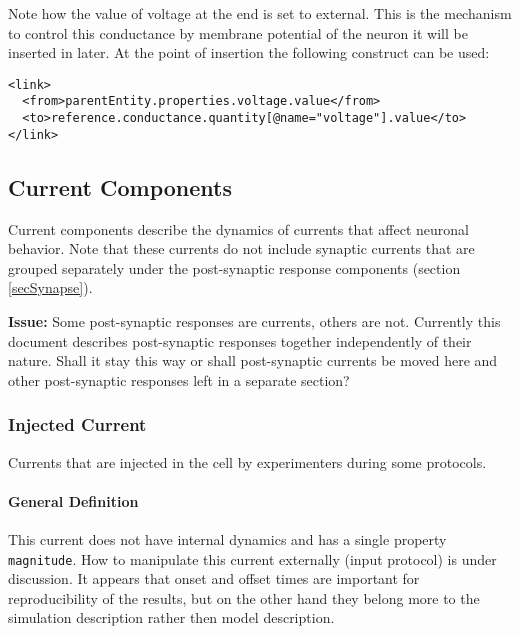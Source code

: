 \documentclass{article}
\newcommand{\issue}[1]{%
\begin{center}
\colorbox{issuecolor}{\parbox{0.8\linewidth}{\textbf{Issue:} #1}}
\end{center}%
}
\begin{document}
Note how the value of voltage at the end is set to external. This is the mechanism
to control this conductance by membrane potential of the neuron it will be inserted
in later. At the point of insertion the following construct can be used:
\begin{verbatim}
<link>
  <from>parentEntity.properties.voltage.value</from>
  <to>reference.conductance.quantity[@name="voltage"].value</to>
</link>
\end{verbatim}

\subsection{Current Components}
\label{currents}

Current components describe the dynamics of currents that affect neuronal
behavior. Note that these currents do not include synaptic currents that
are grouped separately under the post-synaptic response components (section
\ref{secSynapse}).

\issue{Some post-synaptic responses are currents, others are not. Currently this
document describes post-synaptic responses together independently of their nature.
Shall it stay this way or shall post-synaptic currents be moved here and other
post-synaptic responses left in a separate section?}

\subsubsection{Injected Current}
\label{inject}

Currents that are injected in the cell by experimenters during some
protocols.

\paragraph{General Definition}
This current does not have internal dynamics and has a single property
{\tt magnitude}. How to manipulate this current externally (input protocol)
is under discussion. It appears that onset and offset times are important
for reproducibility of the results, but on the other hand they belong more
to the simulation description rather then model description.
\end{document}
